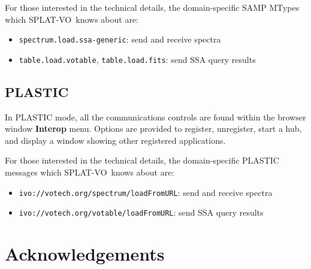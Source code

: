 \documentclass[twoside,11pt]{article}
\renewcommand{\_}{\texttt{\symbol{95}}}
\newcommand{\SPLAT}{\textsf{SPLAT-VO}}
\newcommand{\menuitem}[1]{\textbf{#1}}
\newcommand{\hitext}[1]{\texttt{#1}}
\begin{document}
For those interested in the technical details, the domain-specific
SAMP MTypes which \SPLAT\ knows about are:
\begin{itemize}
\item \hitext{spectrum.load.ssa-generic}:
      send and receive spectra
\item \hitext{table.load.votable}, \hitext{table.load.fits}:
      send SSA query results
\end{itemize}

\newpage
\subsection{PLASTIC}

In PLASTIC mode, all the communications controls are found within
the browser window \menuitem{Interop} menu.
Options are provided to register, unregister, start a hub,
and display a window showing other registered applications.

For those interested in the technical details, the domain-specific
PLASTIC messages which \SPLAT\ knows about are:
\begin{itemize}
\item \hitext{ivo://votech.org/spectrum/loadFromURL}:
      send and receive spectra
\item \hitext{ivo://votech.org/votable/loadFromURL}:
      send SSA query results
\end{itemize}


\newpage
\section{Acknowledgements}
\end{document}
